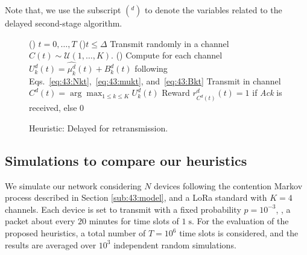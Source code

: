 Note that, we use the subscript $({}^d)$ to denote the variables
related to the delayed second-stage \UCB{} algorithm.

\vspace*{-3pt}
	\begin{figure}[h!]
		\centering
		\begin{algorithm}[H]
			\For()
			{$t = 0, \dots, T$}{
				\uElseIf(){$t \leq \Delta$}{
					Transmit randomly in a channel $C(t) \sim \mathcal{U}(1,\ldots,K)$.
				}
				\Else(){
					Compute for each channel $ U^d_k(t) = \widehat{\mu^d_k}(t) + B^d_k(t)$ following Eqs.~\eqref{eq:43:Nkt},~\eqref{eq:43:mukt}, and~\eqref{eq:43:Bkt}\;
					Transmit in channel $C^d(t) = \arg\max_{1\leq k \leq K} U^d_k(t)$\;
					Reward $r^d_{C^d(t)}(t) = 1$ if \emph{Ack} is received, else $0$\;
				}
			}
			\caption{Heuristic: Delayed \UCB{} for retransmission.}
			\label{algo:43:UCBwithDelay}
		\end{algorithm}
	\end{figure}


\subsection{Simulations to compare our heuristics}
\label{sub:43:numExp}

We simulate our network considering $N$ devices following the contention Markov process described in Section \ref{sub:43:model}, and a LoRa standard with $K=4$ channels.
Each device is set to transmit with a fixed probability $p=10^{-3}$, \ie, a packet about every $20$ minutes for time slots of $1\;\mathrm{s}$.
%
For the evaluation of the proposed heuristics, a total number of $T=10^{6}$ time slots is considered, and the results are averaged over $10^{3}$ independent random simulations.

